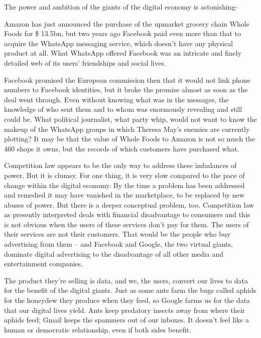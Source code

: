 The power and ambition of the giants of the digital economy is astonishing-


Amazon has just announced the purchase of the upmarket grocery chain Whole Foods for \$ 13.5bn, but two years ago Facebook paid even more than that to acquire the WhatsApp messaging service, which doesn't have any physical product at all. What WhatsApp offered Facebook was an intricate and finely detailed web of its users' friendships and social lives.


Facebook promised the European commission then that it would not link phone numbers to Facebook identities, but it broke the promise almost as soon as the deal went through. Even without knowing what was in the messages, the knowledge of who sent them and to whom was enormously revealing and still could be. What political journalist, what party whip, would not want to know the makeup of the WhatsApp groups in which Theresa May's enemies are currently plotting? It may be that the value of Whole Foods to Amazon is not so much the 460 shops it owns, but the records of which customers have purchased what.


Competition law appears to be the only way to address these imbalances of power. But it is clumsy. For one thing, it is very slow compared to the pace of change within the digital economy. By the time a problem has been addressed and remedied it may have vanished in the marketplace, to be replaced by new abuses of power. But there is a deeper conceptual problem, too. Competition law as presently interpreted deals with financial disadvantage to consumers and this is not obvious when the users of these services don't pay for them. The users of their services are not their customers. That would be the people who buy advertising from them – and Facebook and Google, the two virtual giants, dominate digital advertising to the disadvantage of all other media and entertainment companies.


The product they're selling is data, and we, the users, convert our lives to data for the benefit of the digital giants. Just as some ants farm the bugs called aphids for the honeydew they produce when they feed, so Google farms us for the data that our digital lives yield. Ants keep predatory insects away from where their aphids feed; Gmail keeps the spammers out of our inboxes. It doesn't feel like a human or democratic relationship, even if both sides benefit.